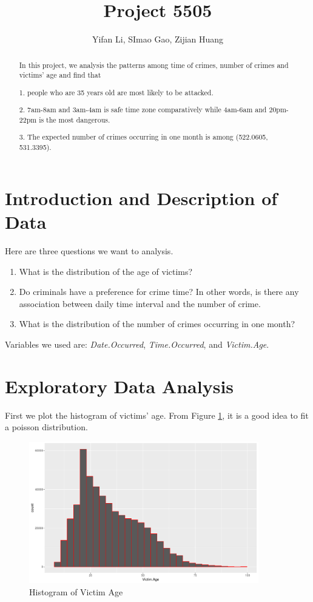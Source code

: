 \documentclass[UTF8]{article}
\title{Project 5505}
\author{Yifan Li, SImao Gao, Zijian Huang}
\begin{document}
\maketitle

\begin{abstract}
    
    In this project, we analysis the patterns among time of crimes, number of crimes and victims' age and find that 
    
    1. people who are 35 years old are most likely to be attacked. 
    
    2. 7am-8am and 3am-4am is safe time zone comparatively while 4am-6am and 20pm-22pm is the most dangerous. 

    3. The expected number of crimes occurring in one month is among (522.0605, 531.3395).



\end{abstract}


\section{Introduction and Description of Data}

Here are three questions we want to analysis.

\begin{enumerate}
    \item What is the distribution of the age of victims?
    \item Do criminals have a preference for crime time? In other words, is there any association between daily time interval and the number of crime.
    \item What is the distribution of the number of crimes occurring in one month?
\end{enumerate}

Variables we used are: \textit{Date.Occurred}, \textit{Time.Occurred}, and \textit{Victim.Age}.

\section{Exploratory Data Analysis}

First we plot the histogram of victims' age. From Figure \ref{fig:Victim_Age}, it is a good idea to fit a poisson distribution.

\begin{figure}[htb]
    \includegraphics[width=10cm,height=6.18cm]{../image/1.pdf}
    \caption{Histogram of Victim Age}\label{fig:Victim_Age} 
\end{figure}
\newpage
\end{document}
